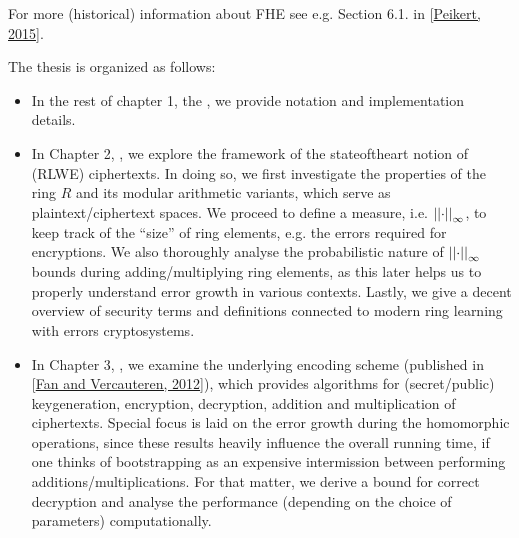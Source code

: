 \documentclass[letterpaper,10pt,english]{jupyterBook}
\begin{document}
\sphinxAtStartPar
For more (historical) information about FHE see e.g. Section 6.1. in {[}\hyperlink{cite.Thesis:id65}{Peikert, 2015}{]}.

\begin{DUlineblock}{0em}
\item[] 
\end{DUlineblock}

\sphinxAtStartPar
The thesis is organized as follows:
\begin{itemize}
\item {} 
\sphinxAtStartPar
In the rest of chapter 1, the {\hyperref[\detokenize{Thesis:introduction}]{}}, we provide notation and implementation details.

\item {} 
\sphinxAtStartPar
In Chapter 2, {\hyperref[\detokenize{Thesis:ring-learning-with-errors}]{}}, we explore the framework of the state\sphinxhyphen{}of\sphinxhyphen{}the\sphinxhyphen{}art notion of (RLWE) ciphertexts.
In doing so, we first investigate the properties of the ring \(R\) and its modular arithmetic variants, which serve as plaintext/ciphertext spaces.
We proceed to define a measure, i.e. \(\left\lvert\left\lvert \cdot \right\rvert\right\rvert_\infty\), to keep track of the “size” of ring elements, e.g. the errors required for encryptions.
We also thoroughly analyse the probabilistic nature of \(\left\lvert\left\lvert \cdot \right\rvert\right\rvert_\infty\)\sphinxhyphen{}bounds during adding/multiplying ring elements, as this later helps us to properly understand error growth in various contexts.
Lastly, we give a decent overview of security terms and definitions connected to modern ring learning with errors cryptosystems.

\item {} 
\sphinxAtStartPar
In Chapter 3, {\hyperref[\detokenize{Thesis:the-bfv-scheme}]{}}, we examine the underlying encoding scheme (published in {[}\hyperlink{cite.Thesis:id70}{Fan and Vercauteren, 2012}{]}), which provides algorithms for (secret/public) key\sphinxhyphen{}generation, encryption, decryption, addition and multiplication of ciphertexts.
Special focus is laid on the error growth during the homomorphic operations, since these results heavily influence the overall running time, if one thinks of bootstrapping as an expensive intermission between performing additions/multiplications.
For that matter, we derive a bound for correct decryption and analyse the performance (depending on the choice of parameters) computationally.


\end{itemize}
\end{document}
